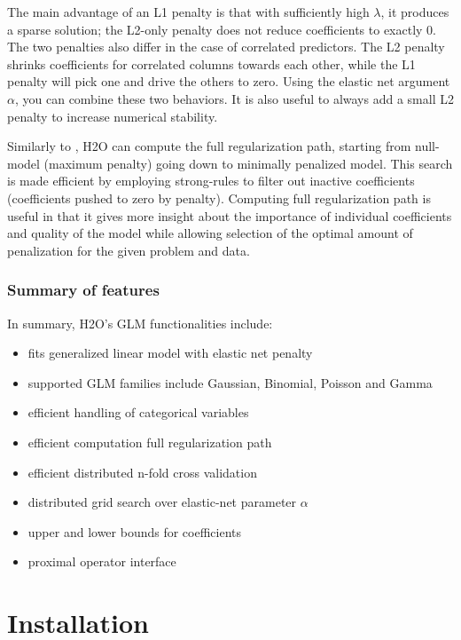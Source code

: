 \documentclass[11pt]{article}
\begin{document}
The main advantage of an L1 penalty is that with sufficiently high $\lambda$, it produces a sparse solution; the L2-only penalty does not reduce coefficients to exactly 0. The two penalties also differ in the case of correlated predictors. The L2 penalty shrinks coefficients for correlated columns towards each other, while the L1 penalty will pick one and drive the others to zero. Using the elastic net argument $\alpha$, you can combine these two behaviors. It is also useful to always add a small L2 penalty to increase numerical stability.

Similarly to \cite{glmnet}, H2O can compute the full regularization path, starting from null-model (maximum penalty) going down to minimally penalized model. This search is made efficient by employing strong-rules \cite{strong} to filter out inactive coefficients (coefficients pushed to zero by penalty). Computing full regularization path is useful in that it gives more insight about the importance of individual coefficients and quality of the model while allowing selection of the optimal amount of penalization for the given problem and data.


\subsubsection{Summary of features} 
In summary, H2O's GLM functionalities include:

\begin{itemize} 
\item fits generalized linear model with elastic net penalty
\item supported GLM families include Gaussian, Binomial, Poisson and Gamma
\item efficient handling of categorical variables
\item efficient computation full regularization path
\item efficient distributed n-fold cross validation
\item distributed grid search over elastic-net parameter $\alpha$
\item upper and lower bounds for coefficients
\item proximal operator interface
\end{itemize}



\section{Installation} 
\end{document}
